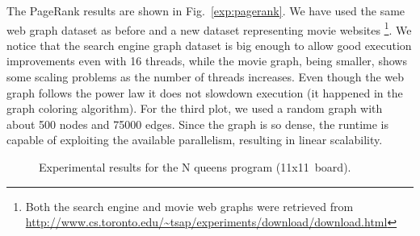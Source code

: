 \begin{figure*}[htp]
   \centering
   \caption{Experimental results for the greedy graph coloring algorithm.}
   \label{exp:graph_coloring}
\end{figure*}

\begin{figure*}[htp]
   \centering
   \caption{Experimental results for the asynchronous PageRank algorithm.}
   \label{exp:pagerank}
\end{figure*}

The PageRank results are shown in Fig.~\ref{exp:pagerank}. We have used the same web graph dataset as before and a new dataset representing movie websites \footnote{Both the search engine and movie web graphs were retrieved from \url{http://www.cs.toronto.edu/~tsap/experiments/download/download.html}}. We notice that the search engine graph dataset is big enough to allow good execution improvements even with 16 threads, while the movie graph, being smaller, shows some scaling problems as the number of threads increases. Even though the web graph follows the power law it does not slowdown execution (it happened in the graph coloring algorithm).
For the third plot, we used a random graph with about 500 nodes and 75000 edges. Since the graph is so dense, the runtime is capable of exploiting the
available parallelism, resulting in linear scalability.

\begin{figure}[h!]
     \centering
    \caption{Experimental results for the N queens program (11x11~board).}
    \label{exp:8queens}
\end{figure}

